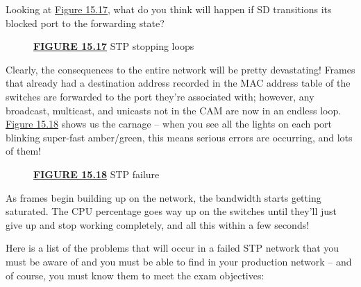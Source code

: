 \documentclass[b5paper,11pt]{memoir}
\begin{document}
Looking at \protect\hyperlink{c15.xhtmlux5cux23figure15-17}{Figure
15.17}, what do you think will happen if SD transitions its blocked port
to the forwarding state?

\begin{figure}
\centering
\caption{{\protect\hyperlink{c15.xhtmlux5cux23figureanchor15-17}{\textbf{FIGURE
15.17}} STP stopping loops}}
\end{figure}

Clearly, the consequences to the entire network will be pretty
devastating! Frames that already had a destination address recorded in
the MAC address table of the switches are forwarded to the port they're
associated with; however, any broadcast, multicast, and unicasts not in
the CAM are now in an endless loop.
\protect\hyperlink{c15.xhtmlux5cux23figure15-18}{Figure 15.18} shows us
the carnage -- when you see all the lights on each port blinking
super-fast amber/green, this means serious errors are occurring, and
lots of them!

\begin{figure}
\centering
\caption{{\protect\hyperlink{c15.xhtmlux5cux23figureanchor15-18}{\textbf{FIGURE
15.18}} STP failure}}
\end{figure}

As frames begin
building up on the network, the bandwidth starts getting saturated. The
CPU percentage goes way up on the switches until they'll just give up
and stop working completely, and all this within a few seconds!

Here is a list of the problems that will occur in a failed STP network
that you must be aware of and you must be able to find in your
production network -- and of course, you must know them to meet the exam
objectives:
\end{document}
